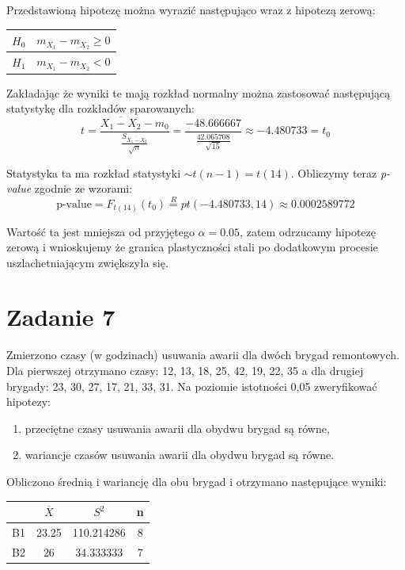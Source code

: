 \documentclass{article}
\begin{document}
Przedstawioną hipotezę można wyrazić następująco wraz z hipotezą zerową:
\begin{center} \begin{tabular}{|c|c|} \hline
$H_0$ & $m_{X_1} - m_{X_2} \geq 0$ \\ \hline
$H_1$ & $m_{X_1} - m_{X_2} < 0$ \\ \hline
\end{tabular} \end{center}

Zakładając że wyniki te mają rozkład normalny można zastosować następującą statystykę dla rozkładów sparowanych:
\[ t = \frac{\overline{X_1-X_2} - m_0}{ \frac{S_{\overline{X_1-X_2}} }{\sqrt{n} } } = \frac{-48.666667}{ \frac{42.065708}{\sqrt{15}} } \approx -4.480733 = t_0\]

Statystyka ta ma rozkład statystyki $\sim t(n-1) = t(14)$. Obliczymy teraz \textit{p-value} zgodnie ze wzorami:
\[ \text{p-value} = F_{t(14)}(t_0) \overset{R}{=} pt(-4.480733, 14) \approx 0.0002589772 \]

Wartość ta jest mniejsza od przyjętego $\alpha = 0.05$, zatem odrzucamy hipotezę zerową i wnioskujemy że granica plastyczności stali po dodatkowym procesie uszlachetniającym zwiększyła się.

\newpage
\section{Zadanie 7}
Zmierzono czasy (w godzinach) usuwania awarii dla dwóch brygad remontowych. Dla pierwszej otrzymano czasy: 12, 13, 18, 25, 42, 19, 22, 35 a dla drugiej brygady: 23, 30, 27, 17, 21, 33, 31.
Na poziomie istotności 0,05 zweryfikować hipotezy:
\begin{enumerate}[label = \alph*)]
\item przeciętne czasy usuwania awarii dla obydwu brygad są równe,
\item wariancje czasów usuwania awarii dla obydwu brygad są równe.
\end{enumerate}

Obliczono średnią i wariancję dla obu brygad i otrzymano następujące wyniki:
\begin{center} \begin{tabular}{|c|c|c|c|} \hline
 & $\overline{X}$ & $S^2$ & n \\ \hline
B1 & 23.25 & 110.214286 & 8\\ \hline
B2 & 26 & 34.333333 & 7\\ \hline
\end{tabular} \end{center}
\end{document}

